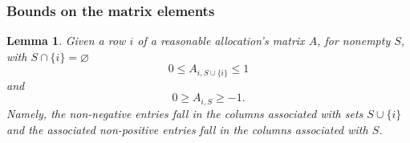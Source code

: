 \documentclass[12pt,letterpaper,final]{article}
\theoremstyle{plain}
\theoremstyle{plain}
\theoremstyle{plain}
\newtheorem{lemma}[theorem]{Lemma}
\theoremstyle{plain}
\theoremstyle{plain}
\theoremstyle{plain}
\theoremstyle{plain}
\theoremstyle{definition}
\theoremstyle{definition}
\theoremstyle{definition}
\theoremstyle{definition}
\theoremstyle{definition}
\theoremstyle{remark}
\theoremstyle{remark}
\theoremstyle{remark}
\theoremstyle{remark}
\begin{document}
\subsubsection{Bounds on the matrix elements}

\begin{lemma}\label{lem:orderSigns}
  Given a row \(i\) of a reasonable allocation's matrix \(A\), 
  for nonempty \(S\), with \(S\cap \{i\} = \varnothing\)
  \begin{equation*}
    0\leq A_{i,S\cup\{i\}} \leq 1
  \end{equation*}
  and 
  \begin{equation*}
    0\geq A_{i,S} \geq -1.
  \end{equation*}
  Namely, the non-negative entries fall in the columns associated with
  sets \(S\cup\{i\}\) and the associated non-positive entries fall in
  the columns associated with \(S\).
\end{lemma}
\end{document}
